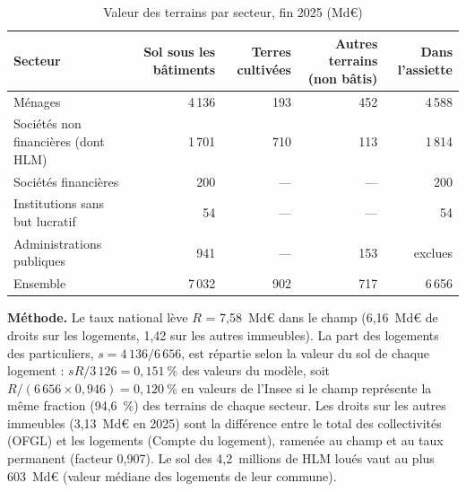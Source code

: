\documentclass[11pt,a4paper]{article}
\begin{document}
\begin{table}[!htbp]\centering\scriptsize
\caption{Valeur des terrains par secteur, fin 2025 (Md€)}\label{tab:fon_insee}
\begin{tabularx}{\linewidth}{@{}>{\raggedright\arraybackslash}X rrrr@{}}
\toprule
Secteur & Sol sous les bâtiments & Terres cultivées & Autres terrains (non bâtis) & Dans l'assiette \\
\midrule
Ménages & 4\,136 & 193 & 452 & 4\,588 \\
Sociétés non financières (dont HLM) & 1\,701 & 710 & 113 & 1\,814 \\
Sociétés financières & 200 & --- & --- & 200 \\
Institutions sans but lucratif & 54 & --- & --- & 54 \\
Administrations publiques & 941 & --- & 153 & exclues \\
Ensemble & 7\,032 & 902 & 717 & 6\,656 \\
\bottomrule
\end{tabularx}
\par{}
\end{table}

\textbf{Méthode.} Le taux national lève $R$ = 7,58~Md€ dans le champ (6,16~Md€ de droits sur les logements, 1,42 sur
les autres immeubles). La part des logements des particuliers, $s = 4\,136/6\,656$, est répartie selon la valeur du sol de
chaque logement : $sR/3\,126 = 0,151~\%$ des valeurs du modèle, soit $R/(6\,656 \times 0,946) = 0,120~\%$ en valeurs de
l'Insee si le champ représente la même fraction (94,6~\%) des terrains de chaque secteur. Les droits sur les autres
immeubles (3,13~Md€ en 2025) sont la différence entre le total des collectivités (OFGL) et les logements (Compte du
logement), ramenée au champ et au taux permanent (facteur 0,907). Le sol des 4,2~millions de HLM loués vaut au plus
603~Md€ (valeur médiane des logements de leur commune).
\end{document}
